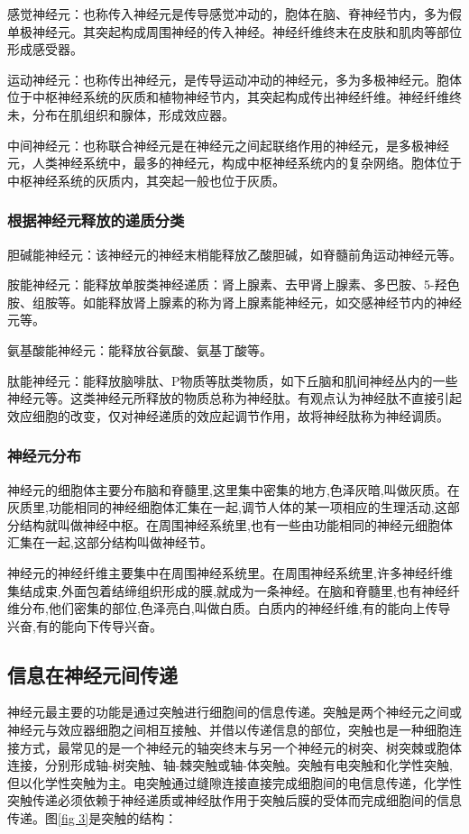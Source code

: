 \documentclass[a4paper,10pt]{article}\large
\begin{document}
感觉神经元：也称传入神经元是传导感觉冲动的，胞体在脑、脊神经节内，多为假单极神经元。其突起构成周围神经的传入神经。神经纤维终末在皮肤和肌肉等部位形成感受器。


运动神经元：也称传出神经元，是传导运动冲动的神经元，多为多极神经元。胞体位于中枢神经系统的灰质和植物神经节内，其突起构成传出神经纤维。神经纤维终未，分布在肌组织和腺体，形成效应器。


中间神经元：也称联合神经元是在神经元之间起联络作用的神经元，是多极神经元，人类神经系统中，最多的神经元，构成中枢神经系统内的复杂网络。胞体位于中枢神经系统的灰质内，其突起一般也位于灰质。


\subsubsection{根据神经元释放的递质分类}

胆碱能神经元：该神经元的神经末梢能释放乙酸胆碱，如脊髓前角运动神经元等。


胺能神经元：能释放单胺类神经递质：肾上腺素、去甲肾上腺素、多巴胺、5-羟色胺、组胺等。如能释放肾上腺素的称为肾上腺素能神经元，如交感神经节内的神经元等。


氨基酸能神经元：能释放谷氨酸、氨基丁酸等。


肽能神经元：能释放脑啡肽、P物质等肽类物质，如下丘脑和肌间神经丛内的一些神经元等。这类神经元所释放的物质总称为神经肽。有观点认为神经肽不直接引起效应细胞的改变，仅对神经递质的效应起调节作用，故将神经肽称为神经调质。

\subsubsection{神经元分布}

神经元的细胞体主要分布脑和脊髓里,这里集中密集的地方,色泽灰暗,叫做灰质。在灰质里,功能相同的神经细胞体汇集在一起,调节人体的某一项相应的生理活动,这部分结构就叫做神经中枢。在周围神经系统里,也有一些由功能相同的神经元细胞体汇集在一起,这部分结构叫做神经节。


神经元的神经纤维主要集中在周围神经系统里。在周围神经系统里,许多神经纤维集结成束,外面包着结缔组织形成的膜,就成为一条神经。在脑和脊髓里,也有神经纤维分布,他们密集的部位,色泽亮白,叫做白质。白质内的神经纤维,有的能向上传导兴奋,有的能向下传导兴奋。


\subsection{信息在神经元间传递}


神经元最主要的功能是通过突触进行细胞间的信息传递。突触是两个神经元之间或神经元与效应器细胞之间相互接触、并借以传递信息的部位，突触也是一种细胞连接方式，最常见的是一个神经元的轴突终末与另一个神经元的树突、树突棘或胞体连接，分别形成轴-树突触、轴-棘突触或轴-体突触。突触有电突触和化学性突触,但以化学性突触为主。电突触通过缝隙连接直接完成细胞间的电信息传递，化学性突触传递必须依赖于神经递质或神经肽作用于突触后膜的受体而完成细胞间的信息传递。图\ref{fig 3}是突触的结构：
\end{document}
